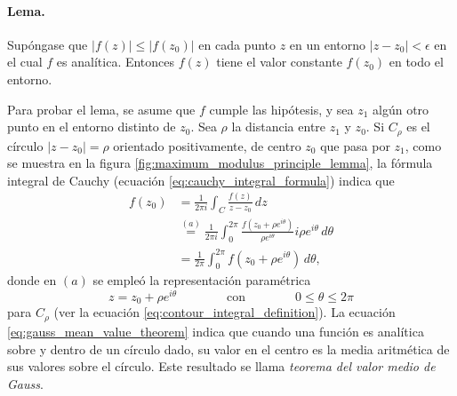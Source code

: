 \documentclass[a4paper]{report}
\begin{document}
\paragraph{Lema.} Supóngase que \(|f(z)|\leq|f(z_0)|\) en cada punto \(z\) en un entorno \(|z-z_0|<\epsilon\) en el cual \(f\) es analítica. Entonces \(f(z)\) tiene el valor constante \(f(z_0)\) en todo el entorno.

Para probar el lema, se asume que \(f\) cumple las hipótesis, y sea \(z_1\) algún otro punto en el entorno distinto de \(z_0\). Sea \(\rho\) la distancia entre \(z_1\) y \(z_0\). Si \(C_\rho\) es el círculo \(|z-z_0|=\rho\) orientado positivamente, de centro \(z_0\) que pasa por \(z_1\), como se muestra en la figura \ref{fig:maximum_modulus_principle_lemma}, la fórmula integral de Cauchy (ecuación \ref{eq:cauchy_integral_formula}) indica que
\begin{align}
 f(z_0)&=\frac{1}{2\pi i}\int_C\frac{f(z)}{z-z_0}\,dz\nonumber\\
  &\overset{(a)}{=}\frac{1}{2\pi i}\int_0^{2\pi}\frac{f(z_0+\rho e^{i\theta})}{\rho e^{i\theta}}i\rho e^{i\theta}\,d\theta\nonumber\\
  &=\frac{1}{2\pi}\int_0^{2\pi}f(z_0+\rho e^{i\theta})\,d\theta,\label{eq:gauss_mean_value_theorem}
\end{align}
donde en \((a)\) se empleó la representación paramétrica
\[
 z=z_0+\rho e^{i\theta}
 \qquad\qquad\textrm{con}\qquad\qquad
 0\leq\theta\leq2\pi
\]
para \(C_\rho\) (ver la ecuación \ref{eq:contour_integral_definition}). La ecuación \ref{eq:gauss_mean_value_theorem} indica que cuando una función es analítica sobre y dentro de un círculo dado, su valor en el centro es la media aritmética de sus valores sobre el círculo. Este resultado se llama \emph{teorema del valor medio de Gauss}.
\end{document}
